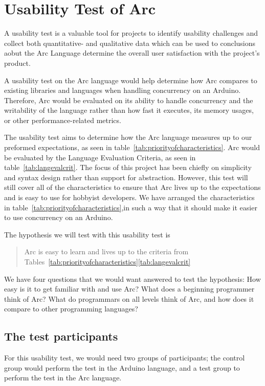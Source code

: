 \section{Usability Test of Arc}\label{subsec:usabilityTestOfArc}
A usability test is a valuable tool for projects to identify usability challenges and collect both quantitative- and qualitative data which can be used to conclusions aobut the Arc Language
determine the overall user satisfaction with the project's product.

A usability test on the Arc language would help determine how Arc compares to existing libraries and languages when handling concurrency on an Arduino. Therefore, Arc would be evaluated on its ability to handle concurrency and the writability of the language rather than how fast it executes, its memory usages, or other performance-related metrics.

The usability test aims to determine how the Arc language measures up to our preformed expectations, as seen in table~\ref{tab:priorityofcharacteristics}. Arc would be evaluated by the Language Evaluation Criteria, as seen in table~\ref{tab:langevalcrit}. The focus of this project has been chiefly on simplicity and syntax design rather than support for abstraction. However, this test will still cover all of the characteristics to ensure that Arc lives up to the expectations and is easy to use for hobbyist developers. We have arranged the characteristics in table~\ref{tab:priorityofcharacteristics},in such a way that it should make it easier to use concurrency on an Arduino.

The hypothesis we will test with this usability test is 

\blockquote{Arc is easy to learn and lives up to the criteria from Tables~\ref{tab:priorityofcharacteristics}\ref{tab:langevalcrit}}

We have four questions that we would want answered to test the hypothesis: How easy is it to get familiar with and use Arc? What does a beginning programmer think of Arc? What do programmars on all levels think of Arc, and how does it compare to other programming languages? 

\subsection{The test participants}\label{subsubsec:theTestParticipants}
For this usability test, we would need two groups of participants; the control group would perform the test in the Arduino language, and a test group to perform the test in the Arc language.

